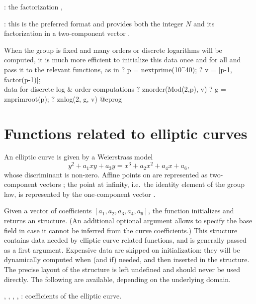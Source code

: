 \item {}: the factorization ,

\item {}: this is the preferred format and provides both the
integer $N$ and its factorization in a two-component vector
\kbd{[$N$, fa]}.

When the group is fixed and many orders or discrete logarithms will be
computed, it is much more efficient to initialize this data once and for all
and pass it to the relevant functions, as in
\bprog
? p = nextprime(10^40);
? v = [p-1, factor(p-1)]; \\ data for discrete log & order computations
? znorder(Mod(2,p), v)
? g = znprimroot(p);
? znlog(2, g, v)
@eprog
\bigskip


\section{Functions related to elliptic curves}

An elliptic curve is given by a Weierstrass model
$$
  y^2+a_1xy+a_3y=x^3+a_2x^2+a_4x+a_6,
$$
whose discriminant is non-zero. Affine points on  are represented as
two-component vectors \kbd{[x,y]}; the point at infinity, i.e.~the identity
element of the group law, is represented by the one-component vector
\kbd{[0]}.

Given a vector of coefficients $[a_1,a_2,a_3,a_4,a_6]$, the function
 initializes and returns an  structure. (An additional
optional argument allows to specify the base field in case it cannot be
inferred from the curve coefficients.) This structure contains data needed by
elliptic curve related functions, and is generally passed as a first argument.
Expensive data are skipped on initialization: they will be dynamically
computed when (and if) needed, and then inserted in the structure. The
precise layout of the  structure is left undefined and should never
be used directly. The following  are available,
depending on the underlying domain.


\item {}, , , , : coefficients of the
elliptic curve.

